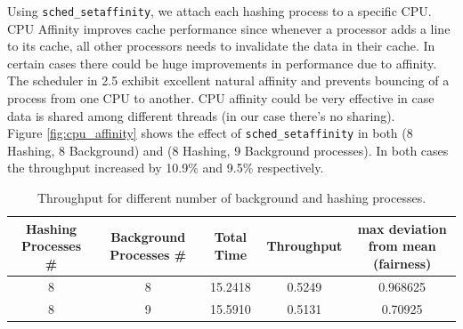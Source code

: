\documentclass[10pt] {article}
\begin{document}
Using \texttt{sched\_setaffinity}, we attach each hashing process to a specific CPU. CPU Affinity improves cache performance since whenever a processor adds a line to its cache, all other processors needs to invalidate the data in their cache. In certain cases there could be huge improvements in performance due to affinity. The scheduler in 2.5 exhibit excellent natural affinity and prevents bouncing of a process from one CPU to another. CPU affinity could be very effective in case data is shared among different threads (in our case there's no sharing).\\

\noindent Figure \ref{fig:cpu_affinity} shows the effect of \texttt{sched\_setaffinity} in both (8 Hashing, 8 Background) and (8 Hashing, 9 Background processes). In both cases the throughput increased by 10.9\% and 9.5\% respectively.

\begin{table}
\centering
\begin{tabular}{ |c|c|c|c|c| } 
 \hline
\textbf{Hashing Processes \#} & \textbf{Background Processes \#} & \textbf{Total Time} & \textbf{Throughput} & \textbf{max deviation from mean (fairness)}\\
\hline
8 & 8 & 15.2418 & 0.5249 & 0.968625\\ 
\hline
8 & 9 & 15.5910 & 0.5131 & 0.70925\\
\hline
\end{tabular}
\caption{Throughput for different number of background and hashing processes.}
\label{table:nvsnplusone}
\end{table}
\end{document}
